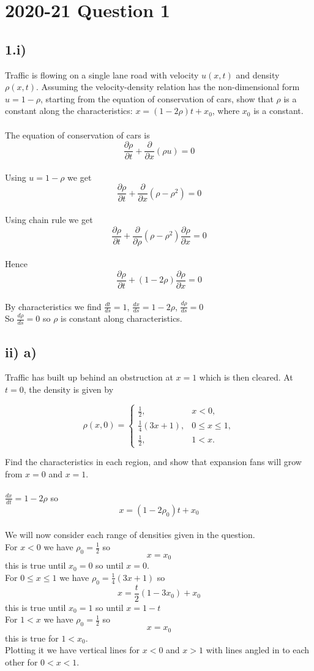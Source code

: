 \documentclass[1pt]{article}
\begin{document}
\section*{2020-21 Question 1}
\subsection*{1.i)}
Traffic is flowing on a single lane road with velocity $u(x, t)$ and density
$\rho(x, t)$. Assuming the velocity-density relation has the non-dimensional
form $u = 1-\rho$, starting from the equation of conservation of cars, show
that $\rho$ is a constant along the characteristics:
$x = (1 - 2\rho)t + x_0$, where $x_0$ is a constant.
\\
\\ The equation of conservation of cars is $$\frac{\partial \rho}{\partial t}+\frac{\partial}{\partial x}(\rho u)=0$$
\\ Using $u=1-\rho$ we get $$\frac{\partial \rho}{\partial t}+\frac{\partial}{\partial x}(\rho-\rho^2)=0$$
\\ Using chain rule we get $$\frac{\partial \rho}{\partial t}+\frac{\partial}{\partial \rho}(\rho-\rho^2)\frac{\partial \rho}{\partial x}=0$$
\\ Hence $$\frac{\partial \rho}{\partial t}+(1-2\rho)\frac{\partial \rho}{\partial x}=0$$
\\ By characteristics we find $\frac{dt}{ds}=1$, $\frac{dx}{ds}=1-2\rho$, $\frac{d\rho}{ds}=0$
\\ So $\frac{d\rho}{ds}=0$ so $\rho$ is constant along characteristics.

\subsection*{ii) a)}
Traffic has built up behind an obstruction at $x = 1$ which is then cleared. At $t = 0$, the density is given by

\[
\rho(x, 0) = 
\begin{cases}
\frac{1}{2}, & x < 0, \\
\frac{1}{4}(3x + 1), & 0 \leq x \leq 1, \\
\frac{1}{2}, & 1 < x.
\end{cases}
\]

Find the characteristics in each region, and show that expansion fans will grow from $x = 0$ and $x = 1$.
\\
\\ $\frac{dx}{dt}=1-2\rho$ so $$x=(1-2\rho_0)t+x_0$$
\\ We will now consider each range of densities given in the question.
\\ For $x<0$ we have $\rho_0=\frac{1}{2}$ so $$x=x_0$$ this is true until $x_0=0$ so until $x=0$.
\\ For $0\leq x \leq 1$ we have $\rho_0=\frac{1}{4}(3x+1)$ so $$x=\frac{t}{2}(1-3x_0)+x_0$$ this is true until $x_0=1$ so until $x=1-t$
\\ For $1<x$ we have $\rho_0=\frac{1}{2}$ so $$x=x_0$$ this is true for $1<x_0$. 
\\ Plotting it we have vertical lines for $x<0$ and $x>1$ with lines angled in to each other for $0<x<1$.
\end{document}
